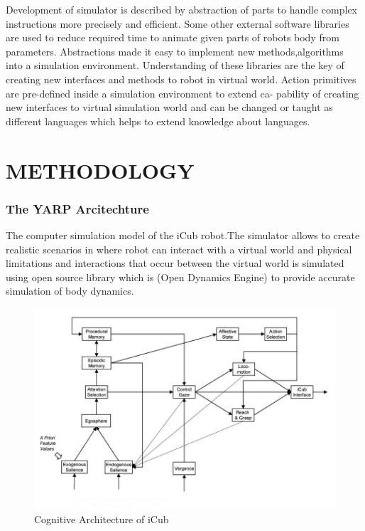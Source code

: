 \documentclass[a4paper, 12pt]{report}
\begin{document}
  Development of simulator is described by abstraction of parts to handle 
  complex 
  instructions more precisely and efficient. Some other external software 
  libraries are used to reduce required time to animate given parts of robots 
  body from parameters. Abstractions made it easy to implement new 
  methods,algorithms into a simulation environment. Understanding of these 
  libraries are the key of creating new interfaces and methods to robot in 
  virtual world.
  Action primitives are pre-defined inside a simulation environment to extend 
  ca- 
  pability of creating new interfaces to virtual simulation world and can be 
  changed or taught as different languages which helps to extend knowledge 
  about 
  languages.
  
  \chapter{METHODOLOGY}
  
  \subsection{The YARP Arcitechture}
  The computer simulation model of the iCub robot.The simulator allows to 
  create realistic scenarios in where robot can interact with a virtual world 
  and 
  physical limitations and interactions that occur between the virtual world is 
  simulated using open source library which is \cite{ODE} (Open Dynamics 
  Engine) 
  to 
  provide accurate simulation of body dynamics.
  
  \begin{figure}[h!]
    \centering
    \includegraphics[width=1.0\linewidth]{cognitive_architecture}
    \caption{Cognitive Architecture of iCub}
    \label{fig:cognitive_architecture}
  \end{figure}
  
\end{document}
